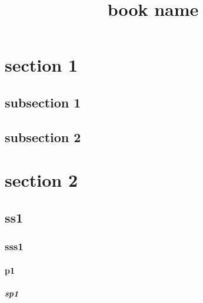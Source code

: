 \documentclass{book}
\begin{document}
\title{book name}
\maketitle

\setcounter{secnumdepth}{5}

\blindtext

\section{section 1}
\subsection{subsection 1}
\Blindtext

\newpage
\subsection{subsection 2}
\Blindtext

\section[s2]{section 2}
\blindtext
\subsection{ss1}
\blindtext
\subsubsection{sss1}
\blindtext
\paragraph{p1}
\blindtext
\subparagraph{sp1}
\blindtext
\end{document}
